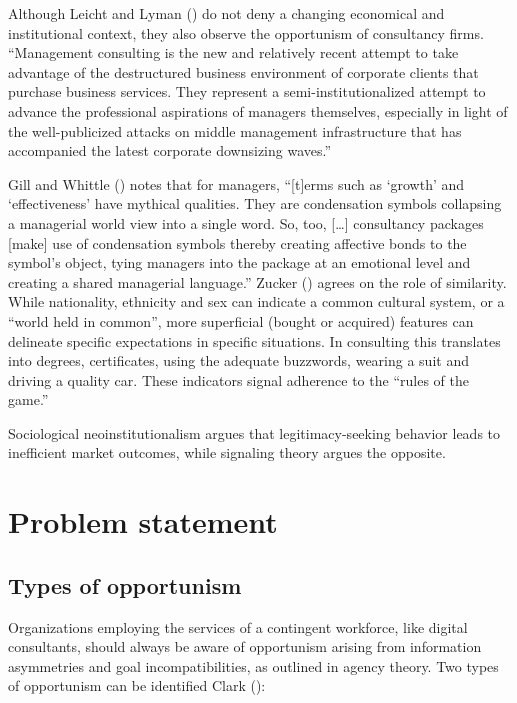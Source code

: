 \documentclass[
  man,floatsintext]{apa6}
\begin{document}
Although Leicht and Lyman () do not deny a changing economical and institutional context, they also observe the opportunism of consultancy firms. ``Management consulting is the new and relatively recent attempt to take advantage of the destructured business environment of corporate clients that purchase business services. They represent a semi-institutionalized attempt to advance the professional aspirations of managers themselves, especially in light of the well-publicized attacks on middle management infrastructure that has accompanied the latest corporate downsizing waves.''

Gill and Whittle () notes that for managers, ``{[}t{]}erms such as `growth' and `effectiveness' have mythical qualities. They are condensation symbols collapsing a managerial world view into a single word. So, too, {[}\ldots{]} consultancy packages {[}make{]} use of condensation symbols thereby creating affective bonds to the symbol's object, tying managers into the package at an emotional level and creating a shared managerial language.'' Zucker () agrees on the role of similarity. While nationality, ethnicity and sex can indicate a common cultural system, or a ``world held in common'', more superficial (bought or acquired) features can delineate specific expectations in specific situations. In consulting this translates into degrees, certificates, using the adequate buzzwords, wearing a suit and driving a quality car. These indicators signal adherence to the ``rules of the game.''

Sociological neoinstitutionalism argues that legitimacy-seeking behavior leads to inefficient market outcomes, while signaling theory argues the opposite.

\section{Problem statement}\label{problem-statement}

\subsection{Types of opportunism}\label{types-of-opportunism}

Organizations employing the services of a contingent workforce, like digital consultants, should always be aware of opportunism arising from information asymmetries and goal incompatibilities, as outlined in agency theory. Two types of opportunism can be identified Clark ():
\end{document}
